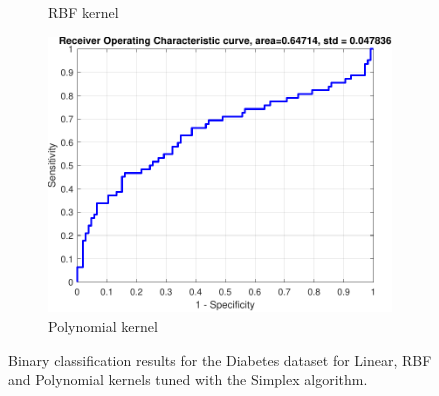 \documentclass{article}
\begin{document}
\begin{figure}[h]
\begin{subfigure}[b]{0.3\textwidth}
                \caption{RBF kernel}
                 \label{fig:diabetes_rbf_roc}
             \end{subfigure}
             \hfill
             \begin{subfigure}[b]{0.3\textwidth}
                 \centering
                 \includegraphics[width=\textwidth]{Assignment 1/figures/diabetes_polynomial_classifier_roc.pdf}
                \caption{Polynomial kernel}
                 \label{fig:diabetes_poly_roc}
             \end{subfigure}
            \caption{Binary classification results for the Diabetes dataset for Linear, RBF and Polynomial kernels tuned with the Simplex algorithm.}
        \end{figure}
        
\end{document}

